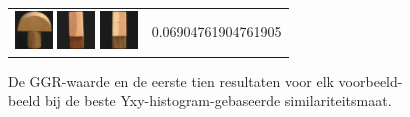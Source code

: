 \begin{figure}[tbp]
\begin{center}
\begin{tabular}{m{11cm} | m{3cm} |}
\includegraphics[width=1cm]{coil/beeld-1.eps}
\includegraphics[width=1cm]{coil/beeld-44.eps}
\includegraphics[width=1cm]{coil/beeld-47.eps}
& {\scriptsize 0.06904761904761905}
\end{tabular}
\caption{\label{fig:results_yxy_histgeb}De GGR-waarde en de eerste tien resultaten voor elk voorbeeld-beeld bij de beste Yxy-histogram-gebaseerde similariteitsmaat.}
\end{center}
\end{figure}
